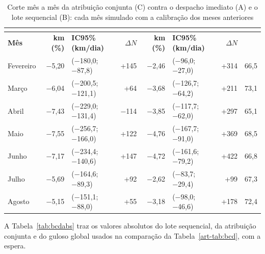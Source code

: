 \begin{table}[!htb]
\caption{Corte mês a mês da atribuição conjunta (C) contra o despacho imediato (A) e o lote sequencial (B): cada mês simulado com a calibração dos meses anteriores}\label{tab:mensal}
\centering\fontetabela\setlength{\tabcolsep}{3pt}
\begin{tabular}{|l|r|l|r|r|l|r|r|}
\hline
 &  &  & \\
\hline
\textbf{Mês} & \textbf{km (\%)} & \textbf{IC95\% (km/dia)} & \textbf{$\Delta N$} & \textbf{km (\%)} & \textbf{IC95\% (km/dia)} & \textbf{$\Delta N$} & \textbf{} \\
\hline
Fevereiro & −5,20 & (−180,0; −87,8) & +145 & −2,46 & (−96,0; −27,0) & +314 & 66,5 \\
\hline
Março & −6,04 & (−200,5; −121,1) & +64 & −3,68 & (−126,7; −64,2) & +211 & 73,1 \\
\hline
Abril & −7,43 & (−229,0; −131,4) & −114 & −3,85 & (−117,7; −62,0) & +297 & 65,1 \\
\hline
Maio & −7,55 & (−256,7; −166,0) & +122 & −4,76 & (−167,7; −91,0) & +369 & 68,5 \\
\hline
Junho & −7,17 & (−234,4; −140,6) & +147 & −4,72 & (−161,6; −79,2) & +422 & 66,8 \\
\hline
Julho & −5,69 & (−164,6; −89,3) & +92 & −2,62 & (−83,7; −29,4) & +99 & 67,3 \\
\hline
Agosto & −5,15 & (−151,1; −88,0) & +55 & −3,18 & (−98,0; −46,6) & +178 & 72,4 \\
\hline
\end{tabular}
\end{table}

A Tabela~\ref{tab:bcdabs} traz os valores absolutos do lote sequencial, da atribuição conjunta e do guloso global usados na comparação da Tabela~\ref{art-tab:bcd}, com a espera.

